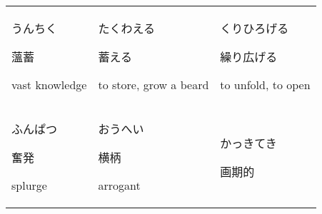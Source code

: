 \documentclass[12pt, a4j, landscape, dvipdfmx]{utarticle}
\begin{document}
    
    \begin{minipage}[t][0pt]{\linewidth }
        \noindent 
        \begin{tabular}{||p{5.5cm}||p{5.5cm}||p{5.5cm}||}
            \hhline{|t:=:t:=:t:=:t|} \rule{0pt}{3ex}
            \hspace*{-.4cm} {\LARGE うんちく}\newline
            \rule{0pt}{3ex} \hspace*{.4cm} {\small
            薀蓄}\newline \rule{0pt}{3ex} \hspace*{.425cm}
            {\small vast knowledge}&\rule{0pt}{3ex}
            \hspace*{-.4cm} {\LARGE たくわえる}\newline
            \rule{0pt}{3ex} \hspace*{.4cm} {\small
            蓄える}\newline \rule{0pt}{3ex} \hspace*{.425cm}
            {\small to store, grow a beard}&\rule{0pt}{3ex}
            \hspace*{-.4cm} {\LARGE くりひろげる}\newline
            \rule{0pt}{3ex} \hspace*{.4cm} {\small
            繰り広げる}\newline \rule{0pt}{3ex} \hspace*{.425cm}
            {\small to unfold, to open}\tabularnewline
            \hhline{|:=::=::=:|} \rule{0pt}{3ex}
            \hspace*{-.4cm} {\LARGE ふんぱつ}\newline
            \rule{0pt}{3ex} \hspace*{.4cm} {\small
            奮発}\newline \rule{0pt}{3ex} \hspace*{.425cm}
            {\small splurge}&\rule{0pt}{3ex} \hspace*{-.4cm}
            {\LARGE おうへい}\newline \rule{0pt}{3ex}
            \hspace*{.4cm} {\small 横柄}\newline
            \rule{0pt}{3ex} \hspace*{.425cm} {\small
            arrogant}&\rule{0pt}{3ex} \hspace*{-.4cm}
            {\LARGE かっきてき}\newline \rule{0pt}{3ex}
            \hspace*{.4cm} {\small 画期的}\newline

\end{tabular}
\end{minipage}
\end{document}

